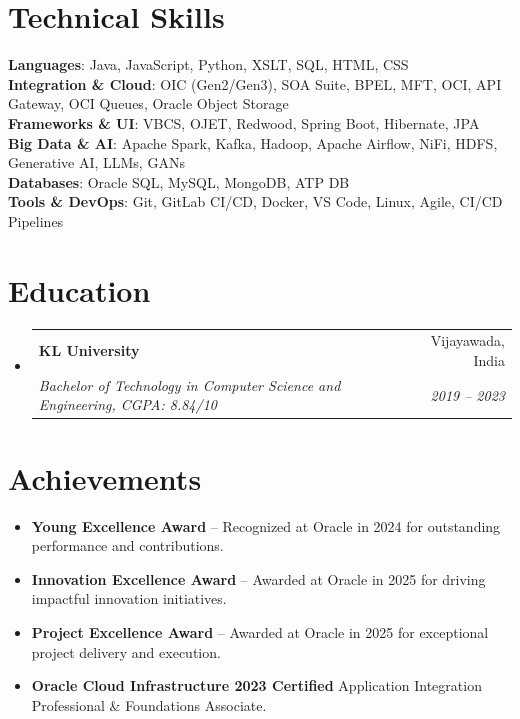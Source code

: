\documentclass[letterpaper,11pt]{article}
\makeatletter
\newcommand{\resumeItem}[1]{
  \item\small{
    {#1 \vspace{-2pt}}
  }
}
\newcommand{\resumeSubheading}[4]{
  \vspace{-2pt}\item
    \begin{tabular*}{0.97\textwidth}[t]{l@{\extracolsep{\fill}}r}
      \textbf{#1} & #2 \\
      \textit{\small#3} & \textit{\small #4} \\
    \end{tabular*}\vspace{-7pt}
}
\newcommand{\resumeSubHeadingListStart}{\begin{itemize}[leftmargin=0.15in, label={}]}
\newcommand{\resumeSubHeadingListEnd}{\end{itemize}}
\newcommand{\resumeItemListStart}{\begin{itemize}}
\newcommand{\resumeItemListEnd}{\end{itemize}\vspace{-5pt}}
\makeatother
\begin{document}
\section{Technical Skills}
\begin{itemize}[leftmargin=0.15in, label={}]
    \small{\item{
        \textbf{Languages}{: Java, JavaScript, Python, XSLT, SQL, HTML, CSS} \\
        \textbf{Integration \& Cloud}{: OIC (Gen2/Gen3), SOA Suite, BPEL, MFT, OCI, API Gateway, OCI Queues, Oracle Object Storage} \\
        \textbf{Frameworks \& UI}{: VBCS, OJET, Redwood, Spring Boot, Hibernate, JPA} \\
        \textbf{Big Data \& AI}{: Apache Spark, Kafka, Hadoop, Apache Airflow, NiFi, HDFS, Generative AI, LLMs, GANs} \\
        \textbf{Databases}{: Oracle SQL, MySQL, MongoDB, ATP DB} \\
        \textbf{Tools \& DevOps}{: Git, GitLab CI/CD, Docker, VS Code, Linux, Agile, CI/CD Pipelines}
    }}
\end{itemize}

\section{Education}
\resumeSubHeadingListStart
    \resumeSubheading
        {KL University}{Vijayawada, India}
        {Bachelor of Technology in Computer Science and Engineering, CGPA: 8.84/10}{2019 -- 2023}
\resumeSubHeadingListEnd

\section{Achievements}
\resumeItemListStart
    \resumeItem{\textbf{Young Excellence Award} -- Recognized at Oracle in 2024 for outstanding performance and contributions.}
    \resumeItem{\textbf{Innovation Excellence Award} -- Awarded at Oracle in 2025 for driving impactful innovation initiatives.}
    \resumeItem{\textbf{Project Excellence Award} -- Awarded at Oracle in 2025 for exceptional project delivery and execution.}
    \resumeItem{\textbf{Oracle Cloud Infrastructure 2023 Certified} Application Integration Professional \& Foundations Associate.}
\resumeItemListEnd
\end{document}
